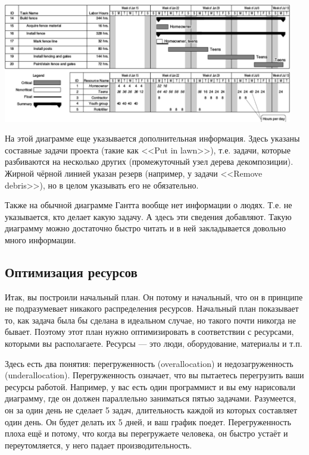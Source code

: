 \documentclass{../../text-style}
\begin{document}
\begin{center}
    \includegraphics[width=0.95\textwidth]{ganttChartResourceUtilization.png}
\end{center}

На этой диаграмме еще указывается дополнительная информация. Здесь указаны составные задачи проекта (такие как <<Put in lawn>>), т.е. задачи, которые разбиваются на несколько других (промежуточный узел дерева декомпозиции). Жирной чёрной линией указан резерв (например, у задачи <<Remove debris>>), но в целом указывать его не обязательно.

Также на обычной диаграмме Гантта вообще нет информации о людях. Т.е. не указывается, кто делает какую задачу. А здесь эти сведения добавляют. Такую диаграмму можно достаточно быстро читать и в ней закладывается довольно много информации.

\subsection{Оптимизация ресурсов}

Итак, вы построили начальный план. Он потому и начальный, что он в принципе не подразумевает никакого распределения ресурсов. Начальный план показывает то, как задача была бы сделана в идеальном случае, но такого почти никогда не бывает. Поэтому этот план нужно оптимизировать в соответствии с ресурсами, которыми вы располагаете. Ресурсы --- это люди, оборудование, материалы и т.п.

Здесь есть два понятия: перегруженность (overallocation) и недозагруженность (underallocation). Перегруженность означает, что вы пытаетесь перегрузить ваши ресурсы работой. Например, у вас есть один программист и вы ему нарисовали диаграмму, где он должен параллельно заниматься пятью задачами. Разумеется, он за один день не сделает 5 задач, длительность каждой из которых составляет один день. Он будет делать их 5 дней, и ваш график поедет. Перегруженность плоха ещё и потому, что когда вы перегружаете человека, он быстро устаёт и переутомляется, у него падает производительность.
\end{document}
